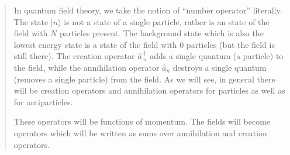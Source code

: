 \begin{frame}
\begin{quote}
In quantum field theory, we take the notion of ``number operator'' literally. The state $|n\rangle$ is not a state of a single particle, rather is an state of the field with $N$ particles present. The background state which is also the lowest energy state is a state of the field with 0 particles (but the field is still there). The creation operator $\widehat{a\,}_n^\dagger$ adds a single quantum (a particle) to the field, while the annihilation operator $\widehat{a}_n$ destroys a single quantum (removes a single particle) from the field. As we will see, in general there will be creation operators and annihilation operators for particles as well as for antiparticles.

These operators will be functions of momentum. The fields will become operators which will be written as sums over annihilation and creation operators.
\end{quote}



\end{frame}



